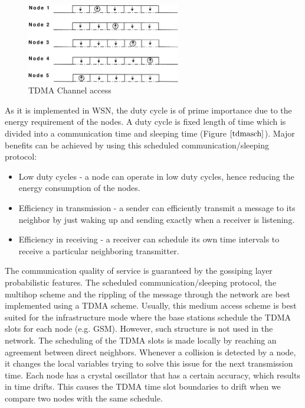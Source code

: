 \documentclass[a4paper,10pt]{report}
\begin{document}
\begin{figure}
\centering
\includegraphics[width=0.6\textwidth]{tdmaschedule}
\caption{TDMA Channel access} \label{tdmasch}
\end{figure}
\newline
As it is implemented in WSN, the duty cycle is of prime importance due to the energy requirement of the nodes. A duty cycle is fixed length of time which is divided into a communication time and sleeping time (Figure $\ref{tdmasch}$). Major benefits can be achieved
by using this scheduled communication/sleeping protocol:
\begin{itemize}
\item Low duty cycles - a node can operate in low duty cycles, hence reducing the energy consumption of the nodes.
\item Efficiency in transmission - a sender can efficiently transmit a message to its neighbor by just waking up and sending exactly when a receiver is listening.
\item Efficiency in receiving - a receiver can schedule its own time intervals to receive a particular neighboring transmitter. \end{itemize} 
The communication quality of service is guaranteed by the gossiping layer probabilistic features. The scheduled communication/sleeping protocol, the multihop scheme and the rippling of the message through the network are best implemented using a TDMA scheme. Usually, this medium access scheme is best suited for the infrastructure mode where the base stations schedule the TDMA slots for each node (e.g. GSM). However, such structure is not used in the network. The scheduling of the TDMA slots is made locally by reaching an agreement between direct neighbors. Whenever a collision is detected by a node, it changes the local variables trying to solve this issue for the next transmission time. Each node has a crystal oscillator that has a certain accuracy, which results in time drifts. This causes the TDMA time slot boundaries to drift when we compare two nodes with the same schedule.
\end{document}
